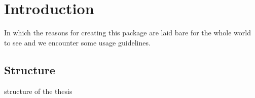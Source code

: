 
\chapter{Introduction}


\begin{center}
  \begin{minipage}{0.5\textwidth}
    \begin{small}
      In which the reasons for creating this package are laid bare for the
      whole world to see and we encounter some usage guidelines.
    \end{small}
  \end{minipage}
  \vspace{0.5cm}
\end{center}







\section{Structure}

structure of the thesis


